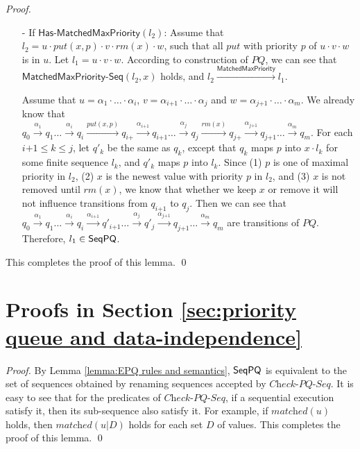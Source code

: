 \begin {proof}
\begin{itemize}
\item[-] If $\mathsf{Has\text{-}MatchedMaxPriority}(l_2)$: Assume that $l_2 = u \cdot \textit{put}(x,p) \cdot v \cdot \textit{rm}(x) \cdot w$, such that all $\textit{put}$ with priority $p$ of $u \cdot v \cdot w$ is in $u$. Let $l_1 = u \cdot v \cdot w$. According to construction of $\textit{PQ}$, we can see that $\mathsf{MatchedMaxPriority\text{-}Seq}(l_2,x)$ holds, and $l_2 \xrightarrow{\mathsf{MatchedMaxPriority}} l_1$.

    Assume that $u = \alpha_1 \cdot \ldots \cdot \alpha_i$, $v = \alpha_{\textit{i+1}} \cdot \ldots \cdot \alpha_j$ and $w = \alpha_{\textit{j+1}} \cdot \ldots \cdot \alpha_m$. We already know that $q_0 \xrightarrow{\alpha_1} q_1 \ldots \xrightarrow{\alpha_i} q_i \xrightarrow{\textit{put}(x,p)} q_{\textit{i+}} \xrightarrow{\alpha_{\textit{i+1}}} q_{\textit{i+1}} \ldots \xrightarrow{\alpha_j} q_j \xrightarrow{\textit{rm}(x)} q_{\textit{j+}} \xrightarrow{\alpha_{\textit{j+1}}} q_{\textit{j+1}} \ldots \xrightarrow{\alpha_m} q_m$. For each $\textit{i+1} \leq k \leq j$, let $q'_k$ be the same as $q_k$, except that $q_k$ maps $p$ into $x \cdot l_k$ for some finite sequence $l_k$, and $q'_k$ maps $p$ into $l_k$. Since (1) $p$ is one of maximal priority in $l_2$, (2) $x$ is the newest value with priority $p$ in $l_2$, and (3) $x$ is not removed until $\textit{rm}(x)$, we know that whether we keep $x$ or remove it will not influence transitions from $q_{\textit{i+1}}$ to $q_j$. Then we can see that $q_0 \xrightarrow{\alpha_1} q_1 \ldots \xrightarrow{\alpha_i} q_i \xrightarrow{\alpha_{\textit{i+1}}} q'_{\textit{i+1}} \ldots \xrightarrow{\alpha_j} q'_j \xrightarrow{\alpha_{\textit{j+1}}} q_{\textit{j+1}} \ldots \xrightarrow{\alpha_m} q_m$ are transitions of $\textit{PQ}$. Therefore, $l_1 \in \mathsf{SeqPQ}$.
\end{itemize}

This completes the proof of this lemma. \qed
\end {proof}






\section{Proofs in Section \ref{sec:priority queue and data-independence}}
\label{sec:appendix proofs in section priority queue and data-independence}

\EPQClosedUnderProjection*

\begin {proof}

By Lemma \ref{lemma:EPQ rules and semantics}, $\mathsf{SeqPQ}$ is equivalent to the set of sequences obtained by renaming sequences accepted by $\textit{Check-PQ-Seq}$. It is easy to see that for the predicates of $\textit{Check-PQ-Seq}$, if a sequential execution satisfy it, then its sub-sequence also satisfy it. For example, if $\textit{matched}(u)$ holds, then $\textit{matched}(u \vert D)$ holds for each set $D$ of values. This completes the proof of this lemma. \qed
\end {proof}


